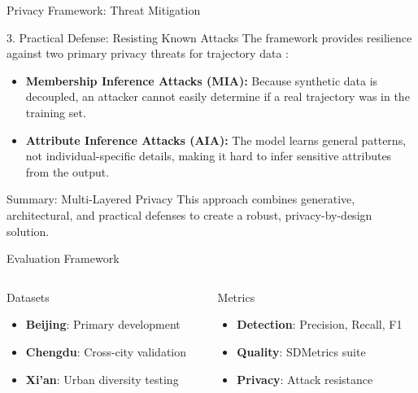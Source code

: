 \documentclass[aspectratio=169,xcolor={dvipsnames}]{beamer}
\begin{document}
\begin{frame}{Privacy Framework: Threat Mitigation}
    \begin{alertblock}{3. Practical Defense: Resisting Known Attacks}
        \small
        The framework provides resilience against two primary privacy threats for trajectory data \cite{buchholzSystematisationKnowledgeTrajectory2024}:
        \begin{itemize}
            \item \textbf{Membership Inference Attacks (MIA):} Because synthetic data is decoupled, an attacker cannot easily determine if a real trajectory was in the training set.
            \item \textbf{Attribute Inference Attacks (AIA):} The model learns general patterns, not individual-specific details, making it hard to infer sensitive attributes from the output.
        \end{itemize}
    \end{alertblock}

    \vspace{1em}
    \begin{block}{Summary: Multi-Layered Privacy}
      \centering
      \large
      This approach combines generative, architectural, and practical defenses to create a robust, privacy-by-design solution.
    \end{block}
\end{frame}

\begin{frame}{Evaluation Framework}
  \begin{columns}[T,onlytextwidth]
    \begin{column}{0.48\textwidth}
      \begin{block}{Datasets}
        \begin{itemize}
          \item \textbf{Beijing}: Primary development
          \item \textbf{Chengdu}: Cross-city validation
          \item \textbf{Xi'an}: Urban diversity testing
        \end{itemize}
      \end{block}
    \end{column}
    \hspace{0.04\textwidth}
    \begin{column}{0.48\textwidth}
      \begin{block}{Metrics}
        \begin{itemize}
          \item \textbf{Detection}: Precision, Recall, F1
          \item \textbf{Quality}: SDMetrics suite
          \item \textbf{Privacy}: Attack resistance
        \end{itemize}
      \end{block}
    \end{column}
  \end{columns}
\end{frame}
\end{document}
